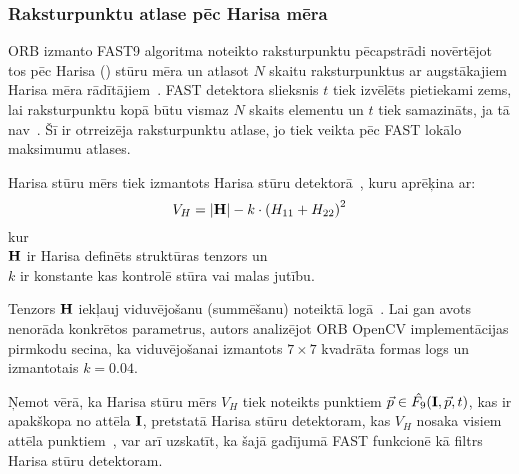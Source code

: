 \subsubsection{Raksturpunktu atlase pēc Harisa mēra}
ORB izmanto FAST9 algoritma noteikto raksturpunktu pēcapstrādi novērtējot tos
pēc Harisa () stūru mēra un atlasot $N$ skaitu
raksturpunktus ar augstākajiem Harisa mēra rādītājiem~\cite{ORB}.
FAST detektora slieksnis $t$ tiek izvēlēts pietiekami zems, lai
raksturpunktu kopā būtu vismaz $N$ skaits elementu un $t$ tiek samazināts,
ja tā nav~\cite{ORB}.
Šī ir otrreizēja raksturpunktu atlase, jo tiek veikta pēc FAST 
lokālo maksimumu atlases.

Harisa stūru mērs tiek izmantots Harisa stūru detektorā~\cite{Harris}\cite{FAST},
kuru aprēķina ar:
\begin{equation}
	V_H = |\mathbf{H}| - k \cdot {(H_{11}+H_{22})}^2
\end{equation}
kur\\
$\mathbf{H}$ ir Harisa definēts struktūras tenzors\cite{Harris}\cite{FAST} un\\
$k$ ir konstante kas kontrolē stūra vai malas jutību.

Tenzors $\mathbf{H}$ iekļauj viduvējošanu (summēšanu) noteiktā
logā~\cite{FAST}. Lai gan avots \cite{ORB} nenorāda konkrētos parametrus,
autors analizējot ORB OpenCV implementācijas pirmkodu\cite{OpenCV-src}
secina, ka viduvējošanai izmantots $7 \times 7$ kvadrāta formas logs un
izmantotais $k=0.04$.

Ņemot vērā, ka Harisa stūru mērs $V_H$ tiek noteikts punktiem
$\vec{p} \in \hat{F_9}(\mathbf{I}, \vec{p}, t)$, kas ir apakškopa no attēla
$\mathbf{I}$, pretstatā Harisa stūru detektoram, kas $V_H$ nosaka visiem attēla
punktiem~\cite{Harris}, var arī uzskatīt, ka šajā gadījumā FAST funkcionē kā
filtrs Harisa stūru detektoram.
